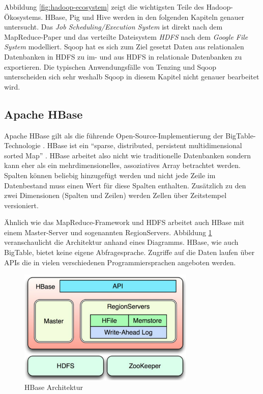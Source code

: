 \documentclass[a4paper]{article}
\begin{document}
Abbildung \ref{fig:hadoop-ecosystem} zeigt die wichtigsten Teile des Hadoop-Ökosystems. HBase, Pig und Hive werden in den folgenden Kapiteln genauer untersucht. Das \textit{Job Scheduling/Execution System} ist direkt nach dem MapReduce-Paper und das verteilte Dateisystem \textit{HDFS} nach dem \textit{Google File System} \cite{GoogleFileSystem:2003} modelliert. Sqoop hat es sich zum Ziel gesetzt Daten aus relationalen Datenbanken in HDFS zu im- und aus HDFS in relationale Datenbanken zu exportieren. Die typischen Anwendungsfälle von Tenzing und Sqoop unterscheiden sich sehr weshalb Sqoop in diesem Kapitel nicht genauer bearbeitet wird.

\subsection{Apache HBase}
Apache HBase \cite{HBase} gilt als die führende Open-Source-Implementierung der BigTable-Technologie \cite{BigTable}. HBase ist ein \enquote{sparse, distributed, persistent multidimensional sorted Map} \cite{JavaMagazin}. HBase arbeitet also nicht wie traditionelle Datenbanken sondern kann eher als ein mehrdimensionelles, assoziatives Array betrachtet werden. Spalten können beliebig hinzugefügt werden und nicht jede Zeile im Datenbestand muss einen Wert für diese Spalten enthalten. Zusätzlich zu den zwei Dimensionen (Spalten und Zeilen) werden Zellen über Zeitstempel versioniert.

Ähnlich wie das MapReduce-Framework und HDFS arbeitet auch HBase mit einem Master-Server und sogenannten RegionServers. Abbildung \ref{fig:hbase} veranschaulicht die Architektur anhand eines Diagramms. HBase, wie auch BigTable, bietet keine eigene Abfragesprache. Zugriffe auf die Daten laufen über APIs die in vielen verschiedenen Programmiersprachen angeboten werden.

\begin{figure}[H]
\centering
\includegraphics[width=0.75\textwidth]{hbase-architecture.png}
\caption{HBase Architektur \cite{docstoc}}
\label{fig:hbase}
\end{figure}
\end{document}
